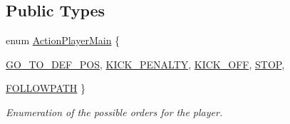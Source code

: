 \subsection*{Public Types}
\begin{DoxyCompactItemize}
\item 
enum \hyperlink{classPlayerMain_af07f952a547b2902a452c1413f26dae2}{ActionPlayerMain} \{ \par
\hyperlink{classPlayerMain_af07f952a547b2902a452c1413f26dae2ad110267c0dfd47655250b6e11cb333ed}{GO\_\-TO\_\-DEF\_\-POS}, 
\hyperlink{classPlayerMain_af07f952a547b2902a452c1413f26dae2a3bfe9a85c58f83e457c2515fab072d03}{KICK\_\-PENALTY}, 
\hyperlink{classPlayerMain_af07f952a547b2902a452c1413f26dae2aa3a0ef85cf87cfe01eb07e7d72e959cd}{KICK\_\-OFF}, 
\hyperlink{classPlayerMain_af07f952a547b2902a452c1413f26dae2a182faa57b0ea5f67cd916a9261df12dc}{STOP}, 
\par
\hyperlink{classPlayerMain_af07f952a547b2902a452c1413f26dae2a19eca8a0a0720f6c698f344b4e6ffb72}{FOLLOWPATH}
 \}
\begin{DoxyCompactList}\small\item\em Enumeration of the possible orders for the player. \item\end{DoxyCompactList}\end{DoxyCompactItemize}

